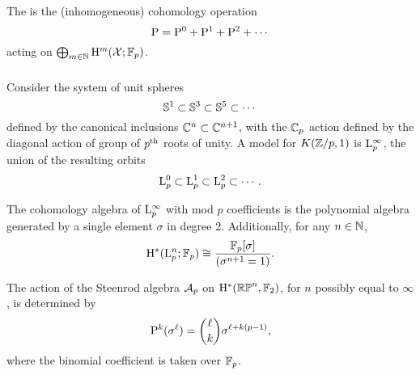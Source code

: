 \medskip The  is the (inhomogeneous) cohomology operation
\[
\mathrm{P} = \mathrm{P}^0 + \mathrm{P}^1 + \mathrm{P}^2 + \dotsb
\]
acting on \(\bigoplus_{m \in \mathbb{N}} \mathrm{H}^m(\mathcal{X}; {\mathbb{F}_p})\).

\subsubsection{}\label{sss:cohomology_lens}

Consider the system of unit spheres
\[
\mathbb{S}^1 \subset \mathbb{S}^3 \subset \mathbb{S}^5 \subset \dotsb
\]
defined by the canonical inclusions \(\mathbb{C}^n \subset \mathbb{C}^{n+1}\), with the \(\mathbb{C}_p\) action defined by the diagonal action of group of \(p^{\mathrm{th}}\) roots of unity.
A model for \(K(\mathbb{Z}/p, 1)\) is \(\mathrm{L}^\infty_p\), the union of the resulting orbits
\[
\mathrm{L}^0_p \subset \mathrm{L}^1_p \subset \mathrm{L}^2_p \subset \dotsb.
\]

The cohomology algebra of $\mathrm{L}^\infty_p$ with mod \(p\) coefficients is the polynomial algebra generated by a single element $\sigma$ in degree 2.
Additionally, for any $n \in \mathbb{N}$,
\[
\mathrm{H}^\ast(\mathrm{L}^n_p; {\mathbb{F}_p}) \cong \frac{{\mathbb{F}_p}[\sigma]}{(\sigma^{n+1} = 1)}.
\]

The action of the Steenrod algebra $\mathcal{A}_p$ on $\mathrm{H}^*(\mathbb{RP}^n, {\mathbb{F}_2})$, for $n$ possibly equal to $\infty$, is determined by
\[
\mathrm{P}^k(\sigma^\ell) = \binom{\ell}{k}\sigma^{\ell+k(p-1)},
\]
where the binomial coefficient is taken over \({\mathbb{F}_p}\).

